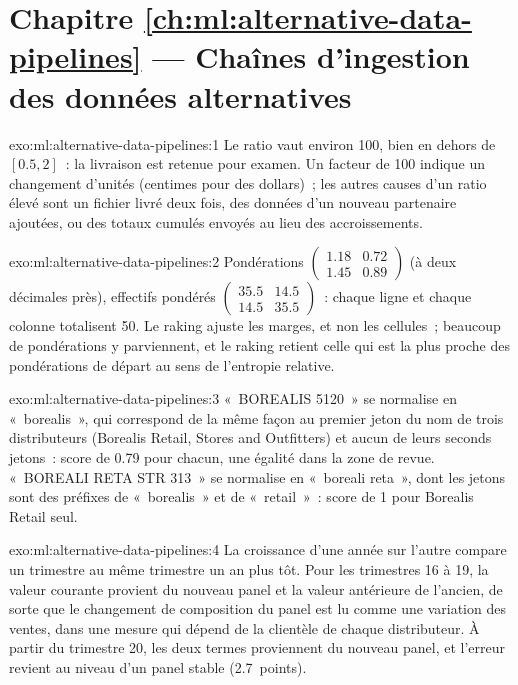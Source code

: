 \section*{Chapitre \ref{ch:ml:alternative-data-pipelines} --- Chaînes d'ingestion des données alternatives}

\begin{solution}{exo:ml:alternative-data-pipelines:1}
Le ratio vaut environ 100, bien en dehors de $[0.5, 2]$~: la livraison est retenue pour examen. Un facteur de 100 indique un changement
d'unités (centimes pour des dollars)~; les autres causes d'un ratio élevé sont un fichier livré deux fois, des données d'un nouveau partenaire ajoutées, ou
des totaux cumulés envoyés au lieu des accroissements.
\end{solution}

\begin{solution}{exo:ml:alternative-data-pipelines:2}
Pondérations $\begin{pmatrix}1.18 & 0.72\\ 1.45 & 0.89\end{pmatrix}$ (à deux décimales près), effectifs pondérés
$\begin{pmatrix}35.5 & 14.5\\ 14.5 & 35.5\end{pmatrix}$~: chaque ligne et chaque colonne totalisent 50. Le raking ajuste les marges, et non
les cellules~; beaucoup de pondérations y parviennent, et le raking retient celle qui est la plus proche des pondérations de départ au sens de l'entropie relative.
\end{solution}

\begin{solution}{exo:ml:alternative-data-pipelines:3}
«~BOREALIS 5120~» se normalise en «~borealis~», qui correspond de la même façon au premier jeton du nom de trois distributeurs (Borealis
Retail, Stores and Outfitters) et aucun de leurs seconds jetons~: score de 0.79 pour chacun, une égalité dans la zone de revue. «~BOREALI RETA
STR 313~» se normalise en «~boreali reta~», dont les jetons sont des préfixes de «~borealis~» et de «~retail~»~: score de 1 pour Borealis
Retail seul.
\end{solution}

\begin{solution}{exo:ml:alternative-data-pipelines:4}
La croissance d'une année sur l'autre compare un trimestre au même trimestre un an plus tôt. Pour les trimestres 16 à 19, la valeur courante provient
du nouveau panel et la valeur antérieure de l'ancien, de sorte que le changement de composition du panel est lu comme une variation des ventes, dans
une mesure qui dépend de la clientèle de chaque distributeur. À partir du trimestre 20, les deux termes proviennent du nouveau panel, et l'erreur
revient au niveau d'un panel stable (2.7~points).
\end{solution}

